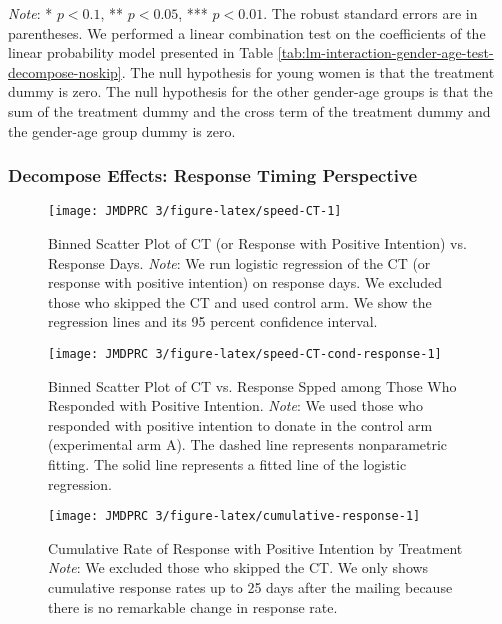 \documentclass[12pt, a4paper]{article}
\begin{document}
\begin{table}[H]
\begin{threeparttable}
\begin{tabular}[t]{llcccccc}
\bottomrule
\end{tabular}
\begin{tablenotes}
\item \emph{Note}: * $p < 0.1$, ** $p < 0.05$, *** $p < 0.01$. The robust standard errors are in parentheses. We performed a linear combination test on the coefficients of the linear probability model presented in Table \ref{tab:lm-interaction-gender-age-test-decompose-noskip}. The null hypothesis for young women is that the treatment dummy is zero. The null hypothesis for the other gender-age groups is that the sum of the treatment dummy and the cross term of the treatment dummy and the gender-age group dummy is zero.
\end{tablenotes}
\end{threeparttable}
\end{table}

\hypertarget{decompose-effects-response-timing-perspective}{%
\subsubsection{Decompose Effects: Response Timing Perspective}\label{decompose-effects-response-timing-perspective}}

\begin{figure}[H]
\texttt{[image: JMDPRC~3/figure-latex/speed-CT-1]} \caption{Binned Scatter Plot of CT (or Response with Positive Intention) vs. Response Days. \newline \emph{Note}: We run logistic regression of the CT (or response with positive intention) on response days. We excluded those who skipped the CT and used control arm. We show the regression lines and its 95 percent confidence interval.}\label{fig:speed-CT}
\end{figure}

\begin{figure}[H]
\texttt{[image: JMDPRC~3/figure-latex/speed-CT-cond-response-1]} \caption{Binned Scatter Plot of CT vs. Response Spped among Those Who Responded with Positive Intention. \newline \emph{Note}: We used those who responded with positive intention to donate in the control arm (experimental arm A). The dashed line represents nonparametric fitting. The solid line represents a fitted line of the logistic regression.}\label{fig:speed-CT-cond-response}
\end{figure}

\begin{figure}[t]
\texttt{[image: JMDPRC~3/figure-latex/cumulative-response-1]} \caption{Cumulative Rate of Response with Positive Intention by Treatment \newline \emph{Note}: We excluded those who skipped the CT. We only shows cumulative response rates up to 25 days after the mailing because there is no remarkable change in response rate.}\label{fig:cumulative-response}
\end{figure}
\end{document}
